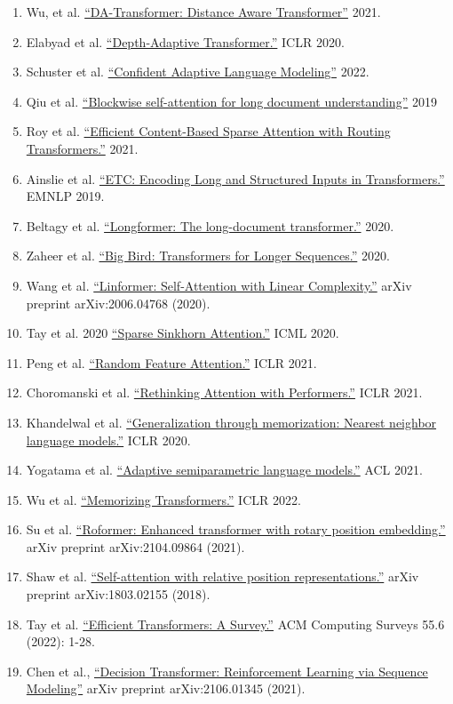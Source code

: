 \documentclass[12pt]{article}
\begin{document}
\begin{enumerate}
\item Wu, et al. \href{https://aclanthology.org/2021.naacl-main.166}{“DA-Transformer: Distance Aware Transformer”} 2021.
\item Elabyad et al. \href{https://arxiv.org/abs/1910.10073}{“Depth-Adaptive Transformer.”} ICLR 2020.
\item Schuster et al. \href{https://arxiv.org/abs/2207.07061}{“Confident Adaptive Language Modeling”} 2022.
\item Qiu et al. \href{https://arxiv.org/abs/1911.02972}{“Blockwise self-attention for long document understanding”} 2019
\item Roy et al. \href{https://arxiv.org/abs/2003.05997}{“Efficient Content-Based Sparse Attention with Routing Transformers.”} 2021.
\item Ainslie et al. \href{https://aclanthology.org/2020.emnlp-main.19/}{“ETC: Encoding Long and Structured Inputs in Transformers.”} EMNLP 2019.
\item Beltagy et al. \href{https://arxiv.org/abs/2004/05150}{“Longformer: The long-document transformer.”} 2020.
\item Zaheer et al. \href{https://arxiv.org/abs/2007.14062}{“Big Bird: Transformers for Longer Sequences.”} 2020.
\item Wang et al. \href{https://arxiv.org/abs/2006.04768}{“Linformer: Self-Attention with Linear Complexity.”} arXiv preprint arXiv:2006.04768 (2020).
\item Tay et al. 2020 \href{https://arxiv.org/abs/2002.11296}{“Sparse Sinkhorn Attention.”} ICML 2020.
\item Peng et al. \href{https://arxiv.org/abs/2103.02143}{“Random Feature Attention.”} ICLR 2021.
\item Choromanski et al. \href{https://arxiv.org/abs/2009.14794}{“Rethinking Attention with Performers.”} ICLR 2021.
\item Khandelwal et al. \href{https://arxiv.org/abs/1911.00172}{“Generalization through memorization: Nearest neighbor language models.”} ICLR 2020.
\item Yogatama et al. \href{https://arxiv.org/abs/2102.02557}{“Adaptive semiparametric language models.”} ACL 2021.
\item Wu et al. \href{https://arxiv.org/abs/2203.08913}{“Memorizing Transformers.”} ICLR 2022.
\item Su et al. \href{https://arxiv.org/abs/2104.09864}{“Roformer: Enhanced transformer with rotary position embedding.”} arXiv preprint arXiv:2104.09864 (2021).
\item Shaw et al. \href{https://arxiv.org/abs/1803.02155}{“Self-attention with relative position representations.”} arXiv preprint arXiv:1803.02155 (2018).
\item Tay et al. \href{https://arxiv.org/abs/2009.06732}{“Efficient Transformers: A Survey.”} ACM Computing Surveys 55.6 (2022): 1-28.
\item Chen et al., \href{https://arxiv.org/abs/2106.01345}{“Decision Transformer: Reinforcement Learning via Sequence Modeling”} arXiv preprint arXiv:2106.01345 (2021).
\end{enumerate}
\end{document}
